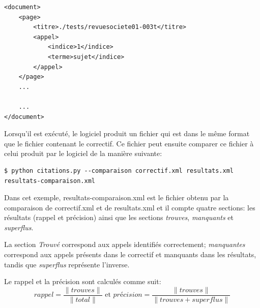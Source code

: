 \begin{lstlisting}
<document>
    <page>
        <titre>./tests/revuesociete01-003t</titre>
        <appel>
            <indice>1</indice>
            <terme>sujet</indice>
        </appel>
    </page>
    ...

    ...
</document>
\end{lstlisting}

Lorsqu'il est exécuté, le logiciel produit un fichier qui est dans le même format que le fichier contenant le correctif. Ce fichier peut ensuite comparer ce fichier à celui produit par le logiciel de la manière suivante:

\begin{lstlisting}
$ python citations.py --comparaison correctif.xml resultats.xml resultats-comparaison.xml
\end{lstlisting}

Dans cet exemple, resultats-comparaison.xml est le fichier obtenu par la comparaison de correctif.xml et de resultats.xml et il compte quatre sections: les résultats (rappel et précision) ainsi que les sections \emph{trouves}, \emph{manquants} et \emph{superflus}.

La section \emph{Trouvé} correspond aux appels identifiés correctement; \emph{manquantes} correspond aux appels présents dans le correctif et manquants dans les résultats, tandis que \emph{superflus} représente l'inverse.

Le rappel et la précision sont calculés comme suit:
\[
rappel = \frac{\|trouves\|}{\|total\|}
\textrm{  et  } 
précision = \frac{\|trouves\|}{\|trouves + superflus\|}
\]

